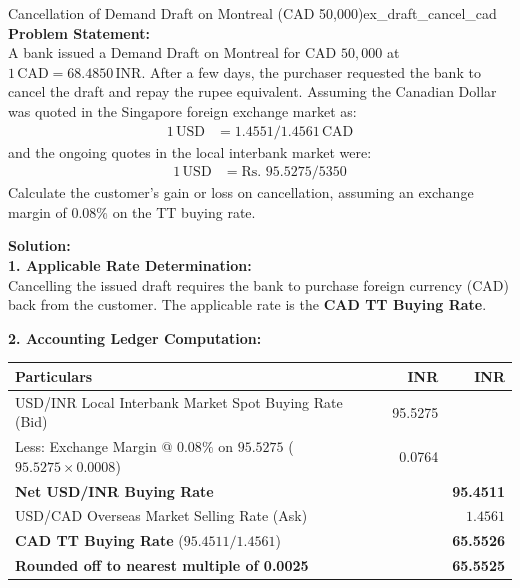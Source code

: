\begin{example}{Cancellation of Demand Draft on Montreal (CAD 50,000)}{ex_draft_cancel_cad}
\textbf{Problem Statement:}\\
A bank issued a Demand Draft on Montreal for $\text{CAD } 50,000$ at $1\,\text{CAD} = 68.4850\,\text{INR}$. After a few days, the purchaser requested the bank to cancel the draft and repay the rupee equivalent. Assuming the Canadian Dollar was quoted in the Singapore foreign exchange market as:
\begin{align*}
    1\,\text{USD} &= 1.4551 / 1.4561\,\text{CAD}
\end{align*}
and the ongoing quotes in the local interbank market were:
\begin{align*}
    1\,\text{USD} &= \text{Rs. } 95.5275 / 5350
\end{align*}
Calculate the customer's gain or loss on cancellation, assuming an exchange margin of $0.08\%$ on the TT buying rate.

\tcblower
\textbf{Solution:}\\
\noindent\textbf{1. Applicable Rate Determination:}\\
Cancelling the issued draft requires the bank to purchase foreign currency (CAD) back from the customer. The applicable rate is the \textbf{CAD TT Buying Rate}.

\noindent\textbf{2. Accounting Ledger Computation:}
\begin{center}
\small
\begin{tabularx}{\linewidth}{Xrr}
\toprule
\textbf{Particulars} & \textbf{INR} & \textbf{INR} \\
\midrule
USD/INR Local Interbank Market Spot Buying Rate (Bid) & 95.5275 & \\
Less: Exchange Margin @ $0.08\%$ on $95.5275$ ($95.5275 \times 0.0008$) & 0.0764 & \\
\midrule
\textbf{Net USD/INR Buying Rate} & & \textbf{95.4511} \\
\midrule
USD/CAD Overseas Market Selling Rate (Ask) & & $1.4561$ \\
\midrule
\textbf{CAD TT Buying Rate} ($95.4511 / 1.4561$) & & \textbf{65.5526} \\
\textbf{Rounded off to nearest multiple of 0.0025} & & \textbf{65.5525} \\
\bottomrule
\end{tabularx}
\end{center}


\end{example}
